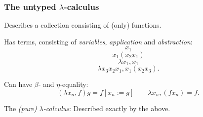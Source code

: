 \documentclass[aspectratio=169]{fancyslides} %
\begin{document}
  \begin{frame}[fragile]
    \begin{columns}
      \begin{column}{.5\textwidth}
        \tableofcontents[currentsection]
      \end{column}
      \begin{column}{.5\textwidth}
      \end{column}
    \end{columns}
  \end{frame}

  \begin{frame}
    \frametitle{The \textbf{untyped} $ \lambda $-calculus}

    Describes a collection consisting of (only) functions.

    \pause

    Has terms, consisting of \textit{variables}, \textit{application} and \textit{abstraction}:
    \[ x_1 \]
    \[ x_1 (x_2 x_1) \]
    \[ \lambda x_1, x_1 \]
    \[ \lambda x_3 x_2 x_1, x_1 (x_2 x_3). \]

    Can have $ \beta $- and $ \eta $-equality:
    \[ (\lambda x_n, f) g = f [x_n := g] \qquad \lambda x_n, (f x_n) = f.\]

    \pause

    The \textit{(pure) $ \lambda $-calculus}: Described exactly by the above.
  \end{frame}
\end{document}
